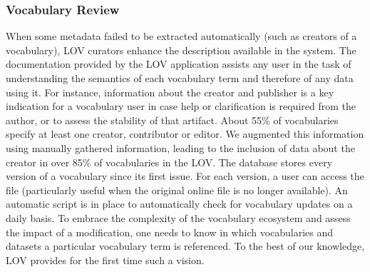 \documentclass{iosart2c}
\begin{document}
	\subsubsection{Vocabulary Review}
When some metadata failed to be extracted automatically (such as creators of a vocabulary), LOV curators enhance the description available in the system. The documentation provided by the LOV application assists any user in the task of understanding the semantics of each vocabulary term and therefore of any data using it. For instance, information about the creator and publisher is a key indication for a vocabulary user in case help or clarification is required from the author, or to assess the stability of that artifact. About 55\% of vocabularies specify at least one creator, contributor or editor. We augmented this information using manually gathered information, leading to the inclusion of data about the creator in over 85\% of vocabularies in the LOV. The database stores every version of a vocabulary since its first issue. For each version, a user can access the file (particularly useful when the original online file is no longer available). An automatic script is in place to automatically check for vocabulary updates on a daily basis. To embrace the complexity of the vocabulary ecosystem and assess the impact of a modification, one needs to know in which vocabularies and datasets a particular vocabulary term is referenced. To the best of our knowledge, LOV provides for the first time such a vision. 
\end{document}
